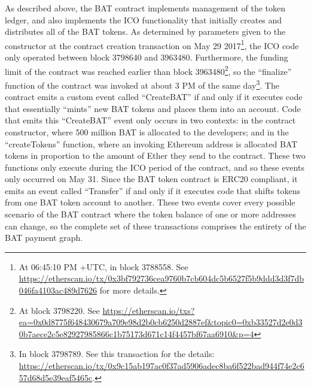 \documentclass[sigconf]{acmart}
\begin{document}
As described above, the BAT contract
implements management of the token ledger,
and also implements the ICO functionality
that initially creates and distributes
all of the BAT tokens.
As determined by parameters given to the constructor
at the contract creation
transaction on May 29 2017\footnote{At 06:45:10 PM +UTC, in block 3788558. See \url{https://etherscan.io/tx/0x3bf792736cea9760b7cb604dc5b6527f5b9ddd3d3f7db046fa4103ac489d7626} for more details.},
the ICO code only operated
between block 3798640 and 3963480.
Furthermore, the funding limit of the 
contract was reached earlier than block
3963480\footnote{At block 3798220. See \url{https://etherscan.io/txs?ea=0x0d8775f648430679a709e98d2b0cb6250d2887ef&topic0=0xb33527d2e0d30b7aece2c5e82927985866c1b75173d671c14f4457bf67aa6910&p=4}},
so the ``finalize'' function of the contract was
invoked at about 3 PM of the same day\footnote{In block 3798789. See this transaction for the details: \url{https://etherscan.io/tx/0x9c15ab197ac0f37ad5906adec8ba6f522bad944f74e2c657d68d5e39eaf5465c}.}.
The contract emits a custom
event called ``CreateBAT'' if and only if
it executes code that essentially ``mints''
new BAT tokens and places them into an account.
Code that emits this ``CreateBAT'' event
only occurs in two contexts:
in the contract constructor, where 500 million BAT
is allocated to the developers;
and in the ``createTokens'' function,
where an invoking Ethereum address is allocated
BAT tokens in proportion to the amount of Ether they
send to the contract. These two functions only
execute during the ICO period of the contract,
and so these events only occurred
on May 31.
Since the BAT token contract is ERC20 compliant,
it emits an event called ``Transfer''
if and only if it executes code that shifts tokens
from one BAT token account to another.
These two events cover every possible scenario of the BAT contract
where the token balance of one or more addresses can change,
so the complete set of these transactions comprises the 
entirety of the BAT payment graph.
\end{document}
